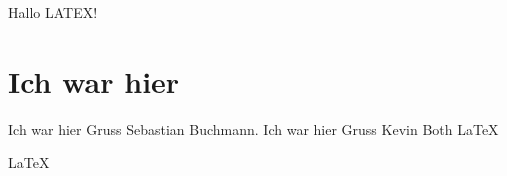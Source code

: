 \documentclass{article}
\begin{document}
Hallo LATEX!  

\section{Ich war hier}

Ich war hier Gruss Sebastian Buchmann.
Ich war hier Gruss Kevin Both
\LaTeX 

\huge
\LaTeX 
   
\end{document}
